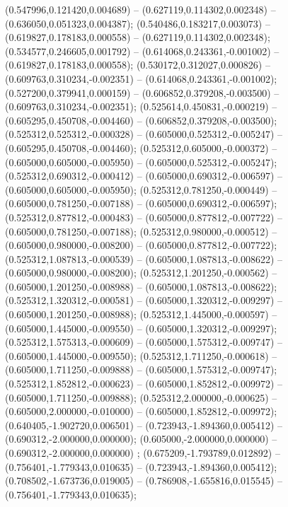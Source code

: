  (0.547996,0.121420,0.004689) -- (0.627119,0.114302,0.002348) -- (0.636050,0.051323,0.004387);
 (0.540486,0.183217,0.003073) -- (0.619827,0.178183,0.000558) -- (0.627119,0.114302,0.002348);
 (0.534577,0.246605,0.001792) -- (0.614068,0.243361,-0.001002) -- (0.619827,0.178183,0.000558);
 (0.530172,0.312027,0.000826) -- (0.609763,0.310234,-0.002351) -- (0.614068,0.243361,-0.001002);
 (0.527200,0.379941,0.000159) -- (0.606852,0.379208,-0.003500) -- (0.609763,0.310234,-0.002351);
 (0.525614,0.450831,-0.000219) -- (0.605295,0.450708,-0.004460) -- (0.606852,0.379208,-0.003500);
 (0.525312,0.525312,-0.000328) -- (0.605000,0.525312,-0.005247) -- (0.605295,0.450708,-0.004460);
 (0.525312,0.605000,-0.000372) -- (0.605000,0.605000,-0.005950) -- (0.605000,0.525312,-0.005247);
 (0.525312,0.690312,-0.000412) -- (0.605000,0.690312,-0.006597) -- (0.605000,0.605000,-0.005950);
 (0.525312,0.781250,-0.000449) -- (0.605000,0.781250,-0.007188) -- (0.605000,0.690312,-0.006597);
 (0.525312,0.877812,-0.000483) -- (0.605000,0.877812,-0.007722) -- (0.605000,0.781250,-0.007188);
 (0.525312,0.980000,-0.000512) -- (0.605000,0.980000,-0.008200) -- (0.605000,0.877812,-0.007722);
 (0.525312,1.087813,-0.000539) -- (0.605000,1.087813,-0.008622) -- (0.605000,0.980000,-0.008200);
 (0.525312,1.201250,-0.000562) -- (0.605000,1.201250,-0.008988) -- (0.605000,1.087813,-0.008622);
 (0.525312,1.320312,-0.000581) -- (0.605000,1.320312,-0.009297) -- (0.605000,1.201250,-0.008988);
 (0.525312,1.445000,-0.000597) -- (0.605000,1.445000,-0.009550) -- (0.605000,1.320312,-0.009297);
 (0.525312,1.575313,-0.000609) -- (0.605000,1.575312,-0.009747) -- (0.605000,1.445000,-0.009550);
 (0.525312,1.711250,-0.000618) -- (0.605000,1.711250,-0.009888) -- (0.605000,1.575312,-0.009747);
 (0.525312,1.852812,-0.000623) -- (0.605000,1.852812,-0.009972) -- (0.605000,1.711250,-0.009888);
 (0.525312,2.000000,-0.000625) -- (0.605000,2.000000,-0.010000) -- (0.605000,1.852812,-0.009972);
 (0.640405,-1.902720,0.006501) -- (0.723943,-1.894360,0.005412) -- (0.690312,-2.000000,0.000000);
 (0.605000,-2.000000,0.000000) -- (0.690312,-2.000000,0.000000) ;
 (0.675209,-1.793789,0.012892) -- (0.756401,-1.779343,0.010635) -- (0.723943,-1.894360,0.005412);
 (0.708502,-1.673736,0.019005) -- (0.786908,-1.655816,0.015545) -- (0.756401,-1.779343,0.010635);
